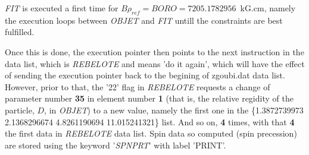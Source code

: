 \medskip

\noindent \textsl{FIT} is executed a first time for $B\rho_{ref}  = BORO=7205.1782956$~kG.cm,
 namely the execution loops between \textsl{OBJET} and \textsl{FIT} 
 untill the constraints are best fulfilled.  

\medskip

\noindent Once this is done, the execution pointer then points to 
the next instruction in the data list, which is   \textsl{REBELOTE} and means 'do it again', which will have the 
effect of sending the execution pointer back to the begining of zgoubi.dat data list. 
However, prior to that, the '22' flag in \textsl{REBELOTE} requests a change of parameter number \textbf{35} in     
element number \textbf{1} (that is, the 
relative regidity of the particle, $D$, in \textsl{OBJET}) to a new value, namely the first one in the 
\{1.3872739973  2.1368296674  4.8261190694  11.015241321\} list. And so on, \textbf{4} times, with that 
\textbf{4} the first data in  \textsl{REBELOTE} data list. Spin data so computed (spin precession) are 
stored using the keyword '\textsl{SPNPRT}' with label 'PRINT'. 


